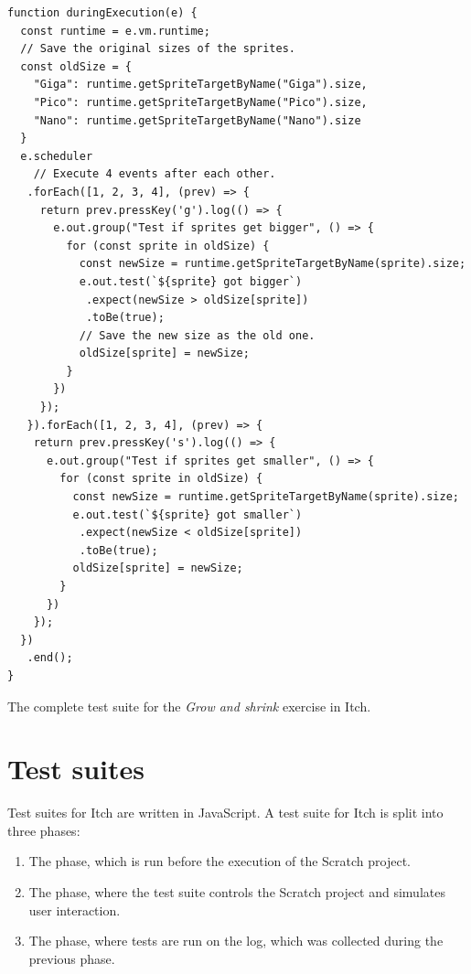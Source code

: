 \documentclass[../main]{subfiles}
\begin{document}
\begin{listing}
    \begin{verbatim}
function duringExecution(e) {
  const runtime = e.vm.runtime;
  // Save the original sizes of the sprites.
  const oldSize = {
    "Giga": runtime.getSpriteTargetByName("Giga").size,
    "Pico": runtime.getSpriteTargetByName("Pico").size,
    "Nano": runtime.getSpriteTargetByName("Nano").size
  }
  e.scheduler
    // Execute 4 events after each other.
   .forEach([1, 2, 3, 4], (prev) => {
     return prev.pressKey('g').log(() => {
       e.out.group("Test if sprites get bigger", () => {
         for (const sprite in oldSize) {
           const newSize = runtime.getSpriteTargetByName(sprite).size;
           e.out.test(`${sprite} got bigger`)
            .expect(newSize > oldSize[sprite])
            .toBe(true);
           // Save the new size as the old one.
           oldSize[sprite] = newSize;
         }
       })
     });
   }).forEach([1, 2, 3, 4], (prev) => {
    return prev.pressKey('s').log(() => {
      e.out.group("Test if sprites get smaller", () => {
        for (const sprite in oldSize) {
          const newSize = runtime.getSpriteTargetByName(sprite).size;
          e.out.test(`${sprite} got smaller`)
           .expect(newSize < oldSize[sprite])
           .toBe(true);
          oldSize[sprite] = newSize;
        }
      })
    });
  })
   .end();
}
    \end{verbatim}
    \caption{The complete test suite for the \emph{Grow and shrink} exercise in Itch.}
    \label{lst:grow-and-shrink-during}
\end{listing}

\section{Test suites}\label{sec:itch-test-suites}

Test suites for Itch are written in JavaScript.
A test suite for Itch is split into three phases:

\begin{enumerate}
    \item The  phase, which is run before the execution of the Scratch project.
    \item The  phase, where the test suite controls the Scratch project and simulates user interaction.
    \item The  phase, where tests are run on the log, which was collected during the previous phase.
\end{enumerate}
\end{document}

